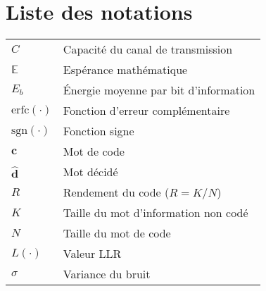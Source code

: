 \chapter*{Liste des notations}
\begin{center}

\begin{longtable}{ p{}  p{} } 

$C$						& 	Capacité du canal de transmission														\\
$\mathbb{E}$            &   Espérance mathématique                                                                  \\
$E_b$         	 		&	Énergie moyenne par bit d'information     												\\
$\text{erfc}(\cdot)$    &	Fonction d'erreur complémentaire     													\\
$\text{sgn}(\cdot)$    	&	Fonction signe																			\\
$\mathbf{c}$			& 	Mot de code 																			\\
$\mathbf{\hat{d}}$		&	Mot décidé																				\\
$R$     	 			&	Rendement du code ($R=K/N$)       														\\
$K$     	  			&	Taille du mot d'information non codé     												\\
$N$     	 			& 	Taille du mot de code                													\\
$L(\cdot)$				&	Valeur LLR 																				\\
$\sigma$				&   Variance du bruit																		\\


		
\end{longtable}

\end{center}
